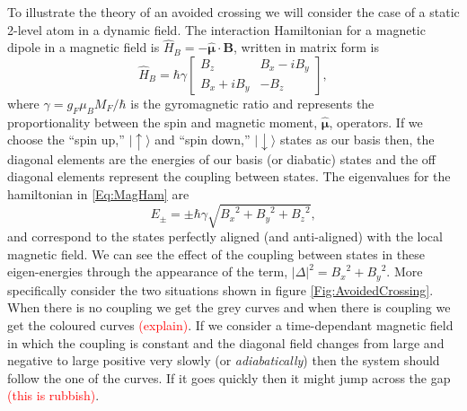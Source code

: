 To illustrate the theory of an avoided crossing we will consider the case of a static 2-level atom in a dynamic field. 
The interaction Hamiltonian for a magnetic dipole in a magnetic field is $\widehat{H}_{B} = -\hat{\boldsymbol{\mu}} \cdot \boldsymbol{B}$, written in matrix form is
\begin{equation}
	\widehat{H}_{B} = \hbar \gamma \begin{bmatrix} B_{z} & B_{x} - i B_{y}\\
											B_{x} + i B_{y} & -B_{z} \end{bmatrix}, \label{Eq:MagHam}
\end{equation}
where $\gamma = g_{F}\mu_{B}M_{F} / \hbar$ is the gyromagnetic ratio and represents the proportionality between the spin and magnetic moment, $\hat{\boldsymbol{\mu}}$, operators. 
If we choose the ``spin up,'' $\vert\uparrow\rangle$ and ``spin down,'' $\vert \downarrow\rangle$ states as our basis then, the diagonal elements are the energies of our basis (or diabatic) states and the off diagonal elements represent the coupling between states. 
The eigenvalues for the hamiltonian in \eqref{Eq:MagHam} are 
\begin{equation}
	E_{\pm} = \pm \hbar \gamma \sqrt{{B_{x}}^{2} + {B_{y}}^{2} + {B_{z}}^{2}},
\end{equation}
and correspond to the states perfectly aligned (and anti-aligned) with the local magnetic field. 
We can see the effect of the coupling between states in these eigen-energies through the appearance of the term, $\left\vert\Delta\right\vert^{2} = {B_{x}}^{2} + {B_{y}}^{2}$. 
More specifically consider the two situations shown in figure \ref{Fig:AvoidedCrossing}. 
When there is no coupling we get the grey curves and when there is coupling we get the coloured curves \textcolor{red}{(explain)}. 
If we consider a time-dependant magnetic field in which the coupling is constant and the diagonal field changes from large and negative to large positive very slowly (or \emph{adiabatically}) then the system should follow the one of the curves. 
If it goes quickly then it might jump across the gap \textcolor{red}{(this is rubbish)}.

